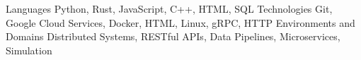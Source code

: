 \begin{cvskills}
    \cvskill
       {Languages}
       {Python, Rust, JavaScript, C++, HTML, SQL}
    \cvskill
       {Technologies}
       {Git, Google Cloud Services, Docker, HTML, Linux, gRPC, HTTP}
    \cvskill
       {Environments and Domains}
       {Distributed Systems, RESTful APIs, Data Pipelines, Microservices, Simulation}
\end{cvskills}
